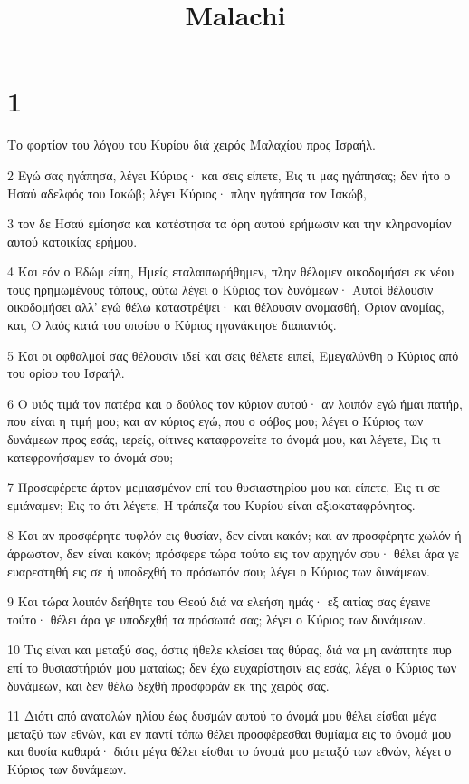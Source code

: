 

\title{Malachi}


\chapter{1}

\par Το φορτίον του λόγου του Κυρίου διά χειρός Μαλαχίου προς Ισραήλ.
\par 2 Εγώ σας ηγάπησα, λέγει Κύριος· και σεις είπετε, Εις τι μας ηγάπησας; δεν ήτο ο Ησαύ αδελφός του Ιακώβ; λέγει Κύριος· πλην ηγάπησα τον Ιακώβ,
\par 3 τον δε Ησαύ εμίσησα και κατέστησα τα όρη αυτού ερήμωσιν και την κληρονομίαν αυτού κατοικίας ερήμου.
\par 4 Και εάν ο Εδώμ είπη, Ημείς εταλαιπωρήθημεν, πλην θέλομεν οικοδομήσει εκ νέου τους ηρημωμένους τόπους, ούτω λέγει ο Κύριος των δυνάμεων· Αυτοί θέλουσιν οικοδομήσει αλλ' εγώ θέλω καταστρέψει· και θέλουσιν ονομασθή, Όριον ανομίας, και, Ο λαός κατά του οποίου ο Κύριος ηγανάκτησε διαπαντός.
\par 5 Και οι οφθαλμοί σας θέλουσιν ιδεί και σεις θέλετε ειπεί, Εμεγαλύνθη ο Κύριος από του ορίου του Ισραήλ.
\par 6 Ο υιός τιμά τον πατέρα και ο δούλος τον κύριον αυτού· αν λοιπόν εγώ ήμαι πατήρ, που είναι η τιμή μου; και αν κύριος εγώ, που ο φόβος μου; λέγει ο Κύριος των δυνάμεων προς εσάς, ιερείς, οίτινες καταφρονείτε το όνομά μου, και λέγετε, Εις τι κατεφρονήσαμεν το όνομά σου;
\par 7 Προσεφέρετε άρτον μεμιασμένον επί του θυσιαστηρίου μου και είπετε, Εις τι σε εμιάναμεν; Εις το ότι λέγετε, Η τράπεζα του Κυρίου είναι αξιοκαταφρόνητος.
\par 8 Και αν προσφέρητε τυφλόν εις θυσίαν, δεν είναι κακόν; και αν προσφέρητε χωλόν ή άρρωστον, δεν είναι κακόν; πρόσφερε τώρα τούτο εις τον αρχηγόν σου· θέλει άρα γε ευαρεστηθή εις σε ή υποδεχθή το πρόσωπόν σου; λέγει ο Κύριος των δυνάμεων.
\par 9 Και τώρα λοιπόν δεήθητε του Θεού διά να ελεήση ημάς· εξ αιτίας σας έγεινε τούτο· θέλει άρα γε υποδεχθή τα πρόσωπά σας; λέγει ο Κύριος των δυνάμεων.
\par 10 Τις είναι και μεταξύ σας, όστις ήθελε κλείσει τας θύρας, διά να μη ανάπτητε πυρ επί το θυσιαστήριόν μου ματαίως; δεν έχω ευχαρίστησιν εις εσάς, λέγει ο Κύριος των δυνάμεων, και δεν θέλω δεχθή προσφοράν εκ της χειρός σας.
\par 11 Διότι από ανατολών ηλίου έως δυσμών αυτού το όνομά μου θέλει είσθαι μέγα μεταξύ των εθνών, και εν παντί τόπω θέλει προσφέρεσθαι θυμίαμα εις το όνομά μου και θυσία καθαρά· διότι μέγα θέλει είσθαι το όνομά μου μεταξύ των εθνών, λέγει ο Κύριος των δυνάμεων.
